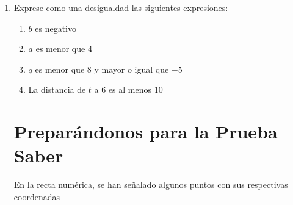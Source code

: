\documentclass[letterpaper,fleqn]{article}
\begin{document}
\begin{enumerate}
\begin{enumerate}
  \end{enumerate}
  \item Exprese como una desigualdad las siguientes expresiones:
  \begin{enumerate}
    \item $ b $ es negativo \hspace*{1cm} \underline{\hspace*{4cm}}
    \item $ a $ es menor que 4 \hspace*{1cm} \underline{\hspace*{4cm}}
    \item $ q $ es menor que 8 y mayor o igual que $ -5 $ \hspace*{1cm} \underline{\hspace*{4cm}}
    \item La distancia de $ t $ a 6 es al menos 10 \hspace*{1cm} \underline{\hspace*{4cm}}
  \end{enumerate}
   \section*{Preparándonos para la Prueba Saber}
  En la recta numérica, se han señalado algunos puntos con sus respectivas coordenadas
  

\end{enumerate}
\end{document}
